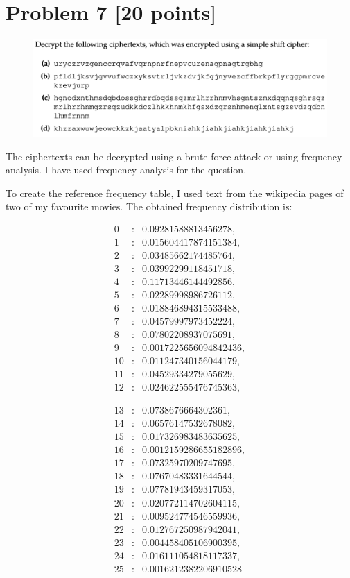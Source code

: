 \documentclass{ashoka-crypto}
\begin{document}
\section*{Problem 7 [20 points]}

\begin{figure}[h]
\includegraphics[width=17cm]{7}
\end{figure}

The ciphertexts can be decrypted using a brute force attack or using frequency analysis. I have used frequency analysis for the question.

To create the reference frequency table, I used text from the wikipedia pages of two of my favourite movies. The obtained frequency distribution is:

\[
\begin{array}{rcl}
0 & : & 0.09281588813456278, \\
1 & : & 0.015604417874151384, \\
2 & : & 0.03485662174485764, \\
3 & : & 0.03992299118451718, \\
4 & : & 0.11713446144492856, \\
5 & : & 0.02289998986726112, \\
6 & : & 0.018846894315533488, \\
7 & : & 0.04579997973452224, \\
8 & : & 0.07802208937075691, \\
9 & : & 0.0017225656094842436, \\
10 & : & 0.011247340156044179, \\
11 & : & 0.04529334279055629, \\
12 & : & 0.024622555476745363,
\end{array}
\]

\[
\begin{array}{rcl}
13 & : & 0.0738676664302361, \\
14 & : & 0.06576147532678082, \\
15 & : & 0.017326983483635625, \\
16 & : & 0.0012159286655182896, \\
17 & : & 0.07325970209747695, \\
18 & : & 0.07670483331644544, \\
19 & : & 0.07781943459317053, \\
20 & : & 0.020772114702604115, \\
21 & : & 0.009524774546559936, \\
22 & : & 0.012767250987942041, \\
23 & : & 0.004458405106900395, \\
24 & : & 0.016111054818117337, \\
25 & : & 0.0016212382206910528
\end{array}
\]
 
\end{document}
